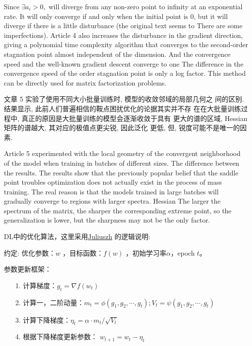 \documentclass[UTF8]{ctexart}
\begin{document}
Since $\exists a_i> 0,$ will diverge from any non-zero point to infinity at an exponential rate. 
It will only converge if and only when the initial point is 0, but it will diverge if there is a 
little disturbance (the original text seems to There are some imperfections). Article 4 also increases 
the disturbance in the gradient direction, giving a polynomial time complexity algorithm that converges 
to the second-order stagnation point almost independent of the dimension. And the convergence speed and 
the well-known gradient descent converge to one The difference in the convergence speed of the order 
stagnation point is only a log factor. This method can be directly used for matrix factorization problems.

文章 5 实验了使用不同大小批量训练时, 模型的收敛邻域的局部几何之
间的区别. 结果显示, 此前人们普遍相信的鞍点困扰优化的论据其实并不存
在在大批量训练过程中, 真正的原因是大批量训练的模型会逐渐收敛于具有
更大的谱的区域, Hessian 矩阵的谱越大, 其对应的极值点更尖锐, 因此泛化
更低, 但, 锐度可能不是唯一的因素.

Article 5 experimented with the local geometry of the convergent neighborhood of the model when training 
in batches of different sizes. The difference between the results. The results show that the previously 
popular belief that the saddle point troubles optimization does not actually exist in the process of mass 
training. The real reason is that the models trained in large batches will gradually converge to regions with 
larger spectra. Hessian The larger the spectrum of the matrix, the sharper the corresponding extreme point, 
so the generalization is lower, but the sharpness may not be the only factor.

DL中的优化算法，这里采用\href{https://zhuanlan.zhihu.com/p/32230623}{Juliuszh}
的逻辑说明:

约定: 优化参数：$w$ ，目标函数：$f(w)$ ，初始学习率$\alpha$，epoch $t$。

参数更新框架：
\begin{itemize}
	\item[1.] 计算梯度：$g_{t}=\nabla f\left(w_{t}\right)$
	\item[2.] 计算一，二阶动量：$m_{t}=\phi\left(g_{1}, g_{2},
	 \cdots, g_{t}\right); V_{t}=\psi\left(g_{1}, g_{2}, \cdots, g_{t}\right)$
	\item[3.] 计算下降梯度：$\eta_{t}=\alpha \cdot m_{t} / \sqrt{V_{t}}$
	\item[4.] 根据下降梯度更新参数： $w_{t+1}=w_{t}-\eta_{t}$
\end{itemize}
\end{document}
